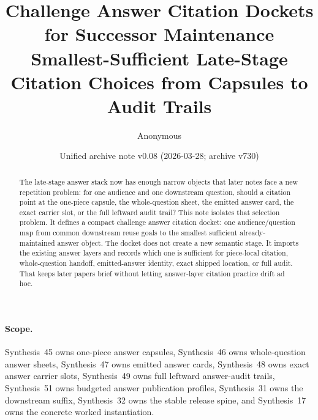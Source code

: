 \documentclass[11pt]{article}
\title{Challenge Answer Citation Dockets for Successor Maintenance\\\large Smallest-Sufficient Late-Stage Citation Choices from Capsules to Audit Trails}
\author{Anonymous}
\date{Unified archive note v0.08 (2026-03-28; archive v730)}
\begin{document}
\maketitle

\begin{abstract}
The late-stage answer stack now has enough narrow objects that later notes face a new repetition problem: for one audience and one downstream question, should a citation point at the one-piece capsule, the whole-question sheet, the emitted answer card, the exact carrier slot, or the full leftward audit trail? This note isolates that selection problem. It defines a compact challenge answer citation docket: one audience/question map from common downstream reuse goals to the smallest sufficient already-maintained answer object. The docket does not create a new semantic stage. It imports the existing answer layers and records which one is sufficient for piece-local citation, whole-question handoff, emitted-answer identity, exact shipped location, or full audit. That keeps later papers brief without letting answer-layer citation practice drift ad hoc.
\end{abstract}

\paragraph{Scope.}
Synthesis~45 owns one-piece answer capsules, Synthesis~46 owns whole-question answer sheets, Synthesis~47 owns emitted answer cards, Synthesis~48 owns exact answer carrier slots, Synthesis~49 owns full leftward answer-audit trails, Synthesis~51 owns budgeted answer publication profiles, Synthesis~31 owns the downstream suffix, Synthesis~32 owns the stable release spine, and Synthesis~17 owns the concrete worked instantiation.\cite{series:challengeanswercapsules,series:challengeanswersheets,series:challengeanswercards,series:challengeanswercarrierslots,series:challengeansweraudittrails,series:challengeanswerpublicationprofiles,series:downstreamnormalforms,series:releasespine,series:workedexample}
\end{document}
